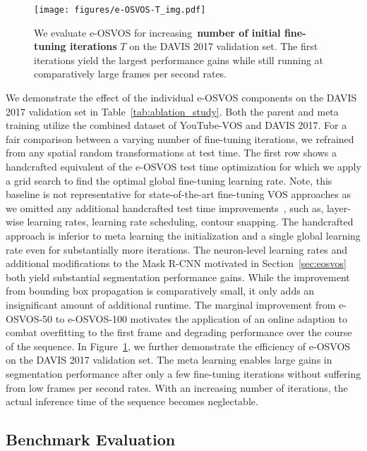 \documentclass{article}
\begin{document}
\begin{table*}
{\begin{tabular}{lcclH}
\bottomrule
    \end{tabular}
    }
\end{table*}     \begin{figure}[t]
    \centering
    \caption{
We evaluate e-OSVOS for increasing~\textbf{number of initial fine-tuning iterations} $T$ on the DAVIS 2017 validation set.
The first iterations yield the largest performance gains while still running at comparatively large frames per second rates.
}
    \texttt{[image: figures/e-OSVOS-T\_img.pdf]}
    \label{fig:e-OSVOS-T}
\end{figure} 


    We demonstrate the effect of the individual e-OSVOS components on the DAVIS 2017 validation set in Table~\ref{tab:ablation_study}.
Both the parent and meta training utilize the combined dataset of YouTube-VOS and DAVIS 2017.
For a fair comparison between a varying number of fine-tuning iterations, we refrained from any spatial random transformations at test time.
The first row shows a handcrafted equivalent of the e-OSVOS test time optimization for which we apply a grid search to find the optimal global fine-tuning learning rate.
Note, this baseline is not representative for state-of-the-art fine-tuning VOS approaches as we omitted any additional handcrafted test time improvements~\cite{OSVOS,OSVOS-S,premvos,onavos}, such as, layer-wise learning rates, learning rate scheduling, contour snapping.
The handcrafted approach is inferior to meta learning the initialization and a single global learning rate even for substantially more iterations.
The neuron-level learning rates and additional modifications to the Mask R-CNN motivated in Section~\ref{sec:eosvos} both yield substantial segmentation performance gains.
While the improvement from bounding box propagation is comparatively small, it only adds an insignificant amount of additional runtime.
The marginal improvement from e-OSVOS-50 to e-OSVOS-100 motivates the application of an online adaption to combat overfitting to the first frame and degrading performance over the course of the sequence.
In Figure~\ref{fig:e-OSVOS-T}, we further demonstrate the efficiency of e-OSVOS on the DAVIS 2017 validation set.
The meta learning enables large gains in segmentation performance after only a few fine-tuning iterations without suffering from low frames per second rates.
With an increasing number of iterations, the actual inference time of the sequence becomes neglectable.

\subsection{Benchmark Evaluation}
\end{document}
